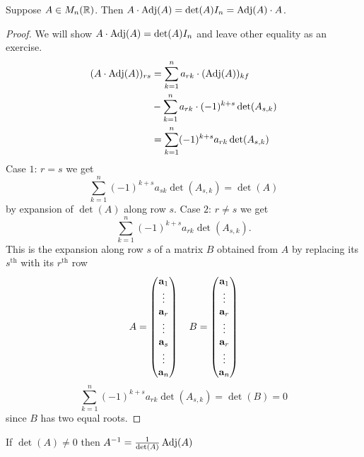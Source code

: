 \documentclass[10pt, a4paper]{article}
\begin{document}
\begin{proposition}
    Suppose $A \in M_n(\mathbb{R})$.
    Then
    $A \cdot \operatorname{Adj}(A) = \det(A)I_n = \operatorname{Adj}(A) \cdot A$.
    \begin{proof}
        We will show $A \cdot \operatorname{Adj}(A) = \det(A)I_n$ and leave other equality as an exercise.
        \begin{align*}
            (A \cdot \operatorname{Adj}(A))_{rs} &= \sum_{k = 1}^{n}a_{rk} \cdot (\operatorname{Adj}(A))_{kf} \\
            &- \sum_{k = 1}^{n}a_{rk}\cdot(-1) ^ {k + s}\det(A_{s, k}) \\
            &= \sum_{k = 1}^{n}(-1) ^ {k + s}a_{rk}\det(A_{s, k})
        \end{align*}
        Case $1$: $r = s$ we get
        \[
        \sum_{k = 1}^{n}(-1) ^ {k + s}a_{sk}\det(A_{s, k}) = \det(A)
        \]
        by expansion of $\det(A)$ along row $s$.
        Case $2$: $r \neq s$ we get
        \[
        \sum_{k = 1}^{n}(-1) ^ {k + s}a_{rk}\det(A_{s, k}).
        \]
        This is the expansion along row $s$ of a matrix $B$ obtained from $A$ by replacing its $s^{\text{th}}$ with its $r^{\text{th}}$ row
        \[
        A = \begin{pmatrix}
            \mathbf{a}_1 \\ \vdots \\ \mathbf{a}_r \\ \vdots \\ \mathbf{a}_s \\ \vdots \\ \mathbf{a}_n
        \end{pmatrix}
        \quad
        B = \begin{pmatrix}
            \mathbf{a}_1 \\ \vdots \\ \mathbf{a}_r \\ \vdots \\ \mathbf{a}_r \\ \vdots \\ \mathbf{a}_n
        \end{pmatrix}
        \]
        \[
        \sum_{k = 1}^{n}(-1) ^ {k + s}a_{rk}\det(A_{s, k}) = \det(B) = 0
        \]
        since $B$ has two equal roots.
    \end{proof}
\end{proposition}
\begin{corollary}
    If $\det(A) \neq 0$ then
    $A ^ {-1} = \frac{1}{\det(A)}\operatorname{Adj}(A)$
\end{corollary}
\end{document}
